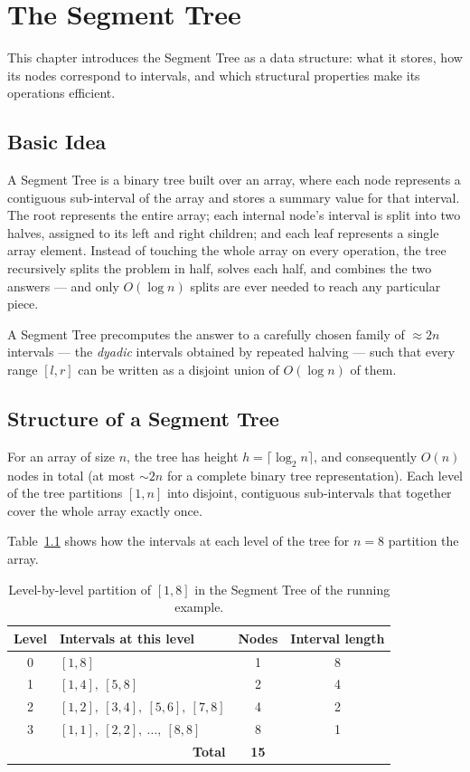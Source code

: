 \documentclass[
  11pt,
  a4paper,
  twoside=false,
  numbers=noenddot,
  headings=big,
  parskip=half,
  toc=bibliography,
  toc=listof,
  bibliography=totoc
]{scrreprt}
\newcounter{example}[chapter]
\newcommand{\tblhead}[1]{\textbf{\sffamily #1}}
\begin{document}
\chapter{The Segment Tree}
\label{ch:segtree}

This chapter introduces the Segment Tree as a data structure: what it stores, how its nodes correspond to intervals, and which structural properties make its operations efficient.

\section{Basic Idea}
A Segment Tree is a binary tree built over an array, where each node represents a contiguous sub-interval of the array and stores a summary value for that interval. The root represents the entire array; each internal node's interval is split into two halves, assigned to its left and right children; and each leaf represents a single array element. Instead of touching the whole array on every operation, the tree recursively splits the problem in half, solves each half, and combines the two answers --- and only $O(\log n)$ splits are ever needed to reach any particular piece.

\begin{keyidea}
A Segment Tree precomputes the answer to a carefully chosen family of $\approx 2n$ intervals --- the \emph{dyadic} intervals obtained by repeated halving --- such that every range $[l,r]$ can be written as a disjoint union of $O(\log n)$ of them.
\end{keyidea}

\section{Structure of a Segment Tree}
For an array of size $n$, the tree has height $h = \lceil \log_2 n \rceil$, and consequently $O(n)$ nodes in total (at most $\sim\!2n$ for a complete binary tree representation). Each level of the tree partitions $[1,n]$ into disjoint, contiguous sub-intervals that together cover the whole array exactly once.

Table~\ref{tab:levels} shows how the intervals at each level of the tree for $n=8$ partition the array.

\begin{table}[h]
\centering
\caption{Level-by-level partition of $[1,8]$ in the Segment Tree of the running example.}
\label{tab:levels}
\begin{tabular}{clcc}
\toprule
\tblhead{Level} & \tblhead{Intervals at this level} & \tblhead{Nodes} & \tblhead{Interval length} \\
\midrule
0 & $[1,8]$ & 1 & 8 \\
1 & $[1,4],\ [5,8]$ & 2 & 4 \\
2 & $[1,2],\ [3,4],\ [5,6],\ [7,8]$ & 4 & 2 \\
3 & $[1,1],\ [2,2],\ \dots,\ [8,8]$ & 8 & 1 \\
\midrule
\multicolumn{2}{r}{\textbf{Total}} & \textbf{15} & \\
\bottomrule
\end{tabular}
\end{table}
\end{document}
